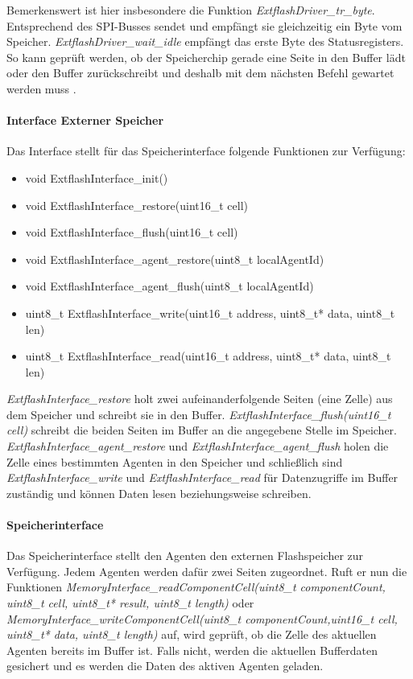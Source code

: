 Bemerkenswert ist hier insbesondere die Funktion \textit{ExtflashDriver\_tr\_byte}. Entsprechend des SPI-Busses sendet und empfängt sie gleichzeitig ein Byte vom Speicher.  \textit{ExtflashDriver\_wait\_idle} empfängt das erste Byte des Statusregisters. So kann geprüft werden, ob der Speicherchip gerade eine Seite in den Buffer lädt oder den Buffer zurückschreibt und deshalb mit dem nächsten Befehl gewartet werden muss \cite{AT45DB041A:2014:Online}.
\paragraph{Interface Externer Speicher}
Das Interface stellt für das Speicherinterface folgende Funktionen zur Verfügung:
\begin{itemize}
  \item void ExtflashInterface\_init()
  \item void ExtflashInterface\_restore(uint16\_t cell)
  \item void ExtflashInterface\_flush(uint16\_t cell)
  \item void ExtflashInterface\_agent\_restore(uint8\_t localAgentId)
  \item void ExtflashInterface\_agent\_flush(uint8\_t localAgentId)
  \item uint8\_t ExtflashInterface\_write(uint16\_t address, uint8\_t* data, uint8\_t len)
  \item uint8\_t ExtflashInterface\_read(uint16\_t address, uint8\_t* data, uint8\_t len)
\end{itemize}
\textit{ExtflashInterface\_restore} holt zwei aufeinanderfolgende Seiten (eine Zelle) aus dem Speicher und schreibt sie in den Buffer. \textit{ExtflashInterface\_flush(uint16\_t cell)} schreibt die beiden Seiten im Buffer an die angegebene Stelle im Speicher. \textit{ExtflashInterface\_agent\_restore} und \textit{ExtflashInterface\_agent\_flush} holen die Zelle eines bestimmten Agenten in den Speicher und schließlich sind \textit{ExtflashInterface\_write} und \textit{ExtflashInterface\_read} für Datenzugriffe im Buffer zuständig und können Daten lesen beziehungsweise schreiben.
\paragraph{Speicherinterface}
Das Speicherinterface stellt den Agenten den externen Flashspeicher zur Verfügung. Jedem Agenten werden dafür zwei Seiten zugeordnet. Ruft er nun die Funktionen \textit{MemoryInterface\_readComponentCell(uint8\_t componentCount, uint8\_t cell, uint8\_t* result, uint8\_t length)} oder \textit{MemoryInterface\_writeComponentCell(uint8\_t componentCount,uint16\_t cell, uint8\_t* data, uint8\_t length)} auf, wird geprüft, ob die Zelle des aktuellen Agenten bereits im Buffer ist. Falls nicht, werden die aktuellen Bufferdaten gesichert und es werden die Daten des aktiven Agenten geladen.
